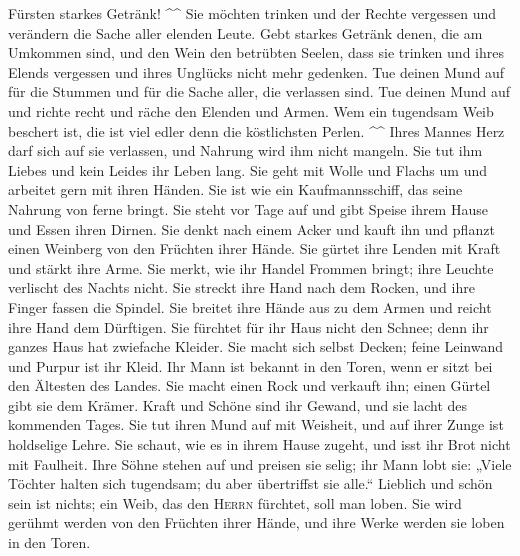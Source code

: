Fürsten starkes Getränk! \^{}\^{}  Sie möchten trinken und
der Rechte vergessen und verändern die Sache aller elenden Leute.
 Gebt starkes Getränk denen, die am Umkommen sind, und den
Wein den betrübten Seelen,  dass sie trinken und ihres
Elends vergessen und ihres Unglücks nicht mehr gedenken. 
Tue deinen Mund auf für die Stummen und für die Sache aller, die
verlassen sind.  Tue deinen Mund auf und richte recht und
räche den Elenden und Armen.  Wem ein tugendsam Weib
beschert ist, die ist viel edler denn die köstlichsten Perlen. \^{}\^{}
 Ihres Mannes Herz darf sich auf sie verlassen, und
Nahrung wird ihm nicht mangeln.  Sie tut ihm Liebes und
kein Leides ihr Leben lang.  Sie geht mit Wolle und
Flachs um und arbeitet gern mit ihren Händen.  Sie ist
wie ein Kaufmannsschiff, das seine Nahrung von ferne bringt.
 Sie steht vor Tage auf und gibt Speise ihrem Hause und
Essen ihren Dirnen.  Sie denkt nach einem Acker und kauft
ihn und pflanzt einen Weinberg von den Früchten ihrer Hände.
 Sie gürtet ihre Lenden mit Kraft und stärkt ihre Arme.
 Sie merkt, wie ihr Handel Frommen bringt; ihre Leuchte
verlischt des Nachts nicht.  Sie streckt ihre Hand nach
dem Rocken, und ihre Finger fassen die Spindel.  Sie
breitet ihre Hände aus zu dem Armen und reicht ihre Hand dem Dürftigen.
 Sie fürchtet für ihr Haus nicht den Schnee; denn ihr
ganzes Haus hat zwiefache Kleider.  Sie macht sich selbst
Decken; feine Leinwand und Purpur ist ihr Kleid.  Ihr
Mann ist bekannt in den Toren, wenn er sitzt bei den Ältesten des
Landes.  Sie macht einen Rock und verkauft ihn; einen
Gürtel gibt sie dem Krämer.  Kraft und Schöne sind ihr
Gewand, und sie lacht des kommenden Tages.  Sie tut ihren
Mund auf mit Weisheit, und auf ihrer Zunge ist holdselige Lehre.
 Sie schaut, wie es in ihrem Hause zugeht, und isst ihr
Brot nicht mit Faulheit.  Ihre Söhne stehen auf und
preisen sie selig; ihr Mann lobt sie:  „Viele Töchter
halten sich tugendsam; du aber übertriffst sie alle.`` 
Lieblich und schön sein ist nichts; ein Weib, das den \textsc{Herrn}
fürchtet, soll man loben.  Sie wird gerühmt werden von
den Früchten ihrer Hände, und ihre Werke werden sie loben in den Toren.
